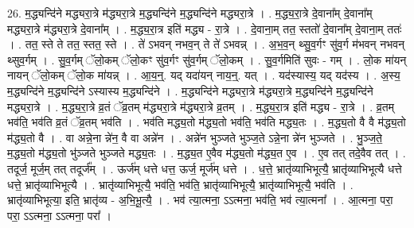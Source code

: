 \documentclass[17pt]{extarticle}
\begin{document}
26. म॒द्ध्यन्दि॑ने मद्ध्यरा॒त्रे म॑द्ध्यरा॒त्रे म॒द्ध्यन्दि॑ने म॒द्ध्यन्दि॑ने मद्ध्यरा॒त्रे । . म॒द्ध्य॒रा॒त्रे दे॒वाना᳚म् दे॒वाना᳚म् मद्ध्यरा॒त्रे म॑द्ध्यरा॒त्रे दे॒वाना᳚म् । . म॒द्ध्य॒रा॒त्र इति॑ मद्ध्य - रा॒त्रे । . दे॒वाना॒म् तत॒ स्ततो॑ दे॒वाना᳚म् दे॒वाना॒म् ततः॑ । . तत॒ स्ते ते तत॒ स्तत॒ स्ते । . ते॑ ऽभवन् नभव॒न् ते ते॑ ऽभवन्न् । . अ॒भ॒व॒न् थ्सु॒व॒र्गꣳ सु॑व॒र्ग म॑भवन् नभवन् थ्सुव॒र्गम् । . सु॒व॒र्गम् ॅलो॒कम् ॅलो॒कꣳ सु॑व॒र्गꣳ सु॑व॒र्गम् ॅलो॒कम् । . सु॒व॒र्गमिति॑ सुवः - गम् । . लो॒क मा॑यन् नायन् ॅलो॒कम् ॅलो॒क मा॑यन्न् । . आ॒य॒न्॒. यद् यदा॑यन् नाय॒न्॒. यत् । . यद॑स्यास्य॒ यद् यद॑स्य । . अ॒स्य॒ म॒द्ध्यन्दि॑ने म॒द्ध्यन्दि॑ने ऽस्यास्य म॒द्ध्यन्दि॑ने । . म॒द्ध्यन्दि॑ने मद्ध्यरा॒त्रे म॑द्ध्यरा॒त्रे म॒द्ध्यन्दि॑ने म॒द्ध्यन्दि॑ने मद्ध्यरा॒त्रे । . म॒द्ध्य॒रा॒त्रे व्र॒तं ॅव्र॒तम् म॑द्ध्यरा॒त्रे म॑द्ध्यरा॒त्रे व्र॒तम् । . म॒द्ध्य॒रा॒त्र इति॑ मद्ध्य - रा॒त्रे । . व्र॒तम् भव॑ति॒ भव॑ति व्र॒तं ॅव्र॒तम् भव॑ति । . भव॑ति मद्ध्य॒तो म॑द्ध्य॒तो भव॑ति॒ भव॑ति मद्ध्य॒तः । . म॒द्ध्य॒तो वै वै म॑द्ध्य॒तो म॑द्ध्य॒तो वै । . वा अन्ने॒ना न्ने॑न॒ वै वा अन्ने॑न । . अन्ने॑न भुञ्जते भुञ्ज॒ते ऽन्ने॒ना न्ने॑न भुञ्जते । . भु॒ञ्ज॒ते॒ म॒द्ध्य॒तो म॑द्ध्य॒तो भु॑ञ्जते भुञ्जते मद्ध्य॒तः । . म॒द्ध्य॒त ए॒वैव म॑द्ध्य॒तो म॑द्ध्य॒त ए॒व । . ए॒व तत् तदे॒वैव तत् । . तदूर्ज॒ मूर्ज॒म् तत् तदूर्ज᳚म् । . ऊर्ज॑म् धत्ते धत्त॒ ऊर्ज॒ मूर्ज॑म् धत्ते । . ध॒त्ते॒ भ्रातृ॑व्याभिभूत्यै॒ भ्रातृ॑व्याभिभूत्यै धत्ते धत्ते॒ भ्रातृ॑व्याभिभूत्यै । . भ्रातृ॑व्याभिभूत्यै॒ भव॑ति॒ भव॑ति॒ भ्रातृ॑व्याभिभूत्यै॒ भ्रातृ॑व्याभिभूत्यै॒ भव॑ति । . भ्रातृ॑व्याभिभूत्या॒ इति॒ भ्रातृ॑व्य - अ॒भि॒भू॒त्यै॒ । . भव॑ त्या॒त्मना॒ ऽऽत्मना॒ भव॑ति॒ भव॑ त्या॒त्मना᳚ । . आ॒त्मना॒ परा॒ परा॒ ऽऽत्मना॒ ऽऽत्मना॒ परा᳚ । \newline
\end{document}

